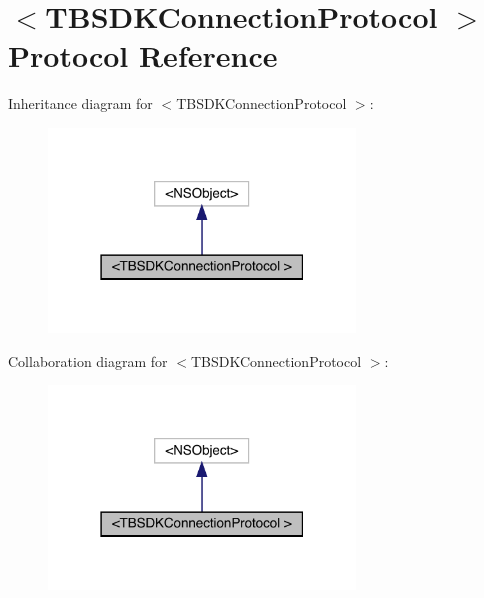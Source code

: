 \hypertarget{protocol_t_b_s_d_k_connection_protocol_01-p}{}\section{$<$T\+B\+S\+D\+K\+Connection\+Protocol $>$ Protocol Reference}
\label{protocol_t_b_s_d_k_connection_protocol_01-p}


Inheritance diagram for $<$T\+B\+S\+D\+K\+Connection\+Protocol $>$\+:\nopagebreak
\begin{figure}[H]
\begin{center}
\leavevmode
\includegraphics[width=231pt]{protocol_t_b_s_d_k_connection_protocol_01-p__inherit__graph}
\end{center}
\end{figure}


Collaboration diagram for $<$T\+B\+S\+D\+K\+Connection\+Protocol $>$\+:\nopagebreak
\begin{figure}[H]
\begin{center}
\leavevmode
\includegraphics[width=231pt]{protocol_t_b_s_d_k_connection_protocol_01-p__coll__graph}
\end{center}
\end{figure}
